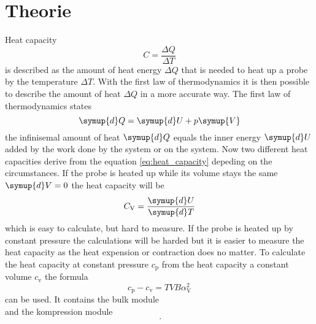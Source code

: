 \section{Theorie}
\label{sec:theorie}

Heat capacity 
\begin{equation}
    C = \frac{\Delta Q}{\Delta T}
    \label{eq:heat_capacity}
\end{equation}
is described as the amount of heat energy $\Delta Q$ that is needed to heat up a probe by the temperature $\Delta T$.
With the first law of thermodynamics it is then possible to describe the amount of heat $\Delta Q$ in a more accurate way.
The first law of thermodynamics states 
\begin{equation*}
    \symup{d}Q = \symup{d}U + p\symup{V}
\end{equation*}
the infinisemal amount of heat $\symup{d}Q$ equals the inner energy $\symup{d}U$ added by the work done by the system or on the system.
Now two different heat capacities derive from the equation \eqref{eq:heat_capacity} depeding on the circumstances.
If the probe is heated up while its volume stays the same $\symup{d}V=0$ the heat capacity will be 
\begin{equation}
    C_\text{V} = \frac{\symup{d}U}{\symup{d}T}
    \label{eq:heat_cap_v}
\end{equation}
which is easy to calculate, but hard to measure.
If the probe is heated up by constant pressure the calculations will be harded but it is easier to measure the heat capacity as the heat expension or contraction does no matter.
To calculate the heat capacity at constant pressure $c_\text{p}$ from the heat capacity a constant volume $c_\text{v}$ the formula
\begin{equation}
    c_\text{p} - c_\text{v} = TVB\alpha_\text{V}^2
    \label{eq:correction_formula}
\end{equation}
can be used.
It contains the bulk module 
\begin{equation*}

\end{equation*}
and the kompression module
\begin{equation*}
    \, .
\end{equation*}
